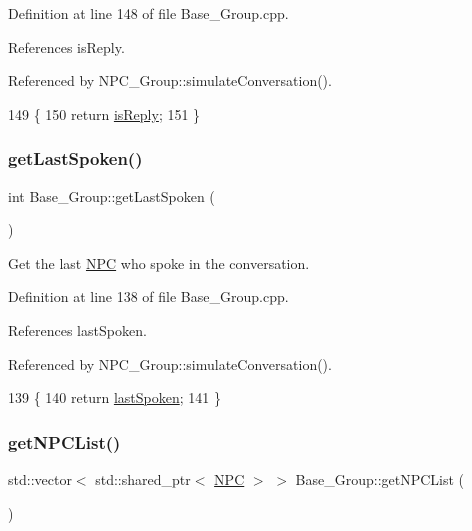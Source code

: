 Definition at line 148 of file Base\+\_\+\+Group.\+cpp.



References is\+Reply.



Referenced by N\+P\+C\+\_\+\+Group\+::simulate\+Conversation().


\begin{DoxyCode}
149 \{
150     \textcolor{keywordflow}{return} \hyperlink{class_base___group_ad9dc72068ed8309820873de4084aa602}{isReply};
151 \}
\end{DoxyCode}
\mbox{\label{class_base___group_a8fb88afb104365ec23447ee1f3649b4c}} 
\subsubsection{\texorpdfstring{get\+Last\+Spoken()}{getLastSpoken()}}
{\footnotesize\ttfamily int Base\+\_\+\+Group\+::get\+Last\+Spoken (\begin{DoxyParamCaption}{ }\end{DoxyParamCaption})}



Get the last \hyperlink{class_n_p_c}{N\+PC} who spoke in the conversation. 



Definition at line 138 of file Base\+\_\+\+Group.\+cpp.



References last\+Spoken.



Referenced by N\+P\+C\+\_\+\+Group\+::simulate\+Conversation().


\begin{DoxyCode}
139 \{
140     \textcolor{keywordflow}{return} \hyperlink{class_base___group_aa031e7ea2c490eae2e8101fb4093da00}{lastSpoken};
141 \}
\end{DoxyCode}
\mbox{\label{class_base___group_a75eec9132aaf532b4429e0af76b31775}} 
\subsubsection{\texorpdfstring{get\+N\+P\+C\+List()}{getNPCList()}}
{\footnotesize\ttfamily std\+::vector$<$ std\+::shared\+\_\+ptr$<$ \hyperlink{class_n_p_c}{N\+PC} $>$ $>$ Base\+\_\+\+Group\+::get\+N\+P\+C\+List (\begin{DoxyParamCaption}{ }\end{DoxyParamCaption})}



